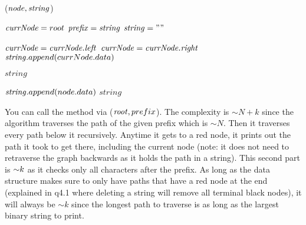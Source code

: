 \begin{problem}
\begin{questions}
\begin{myalgo}{($\textit{node\/},\textit{string\/}$)}
    \RETURN
  \ENDIF

    \STATE $\textit{currNode\/} = root$
    \STATE $\textit{prefix\/} = \textit{string\/}$
    \STATE $\textit{string\/} = ""$

        \STATE $\textit{currNode\/} = \textit{currNode.left\/}$
        \STATE $\textit{currNode\/} = \textit{currNode.right\/}$
      \ENDIF
      \STATE $\textit{string\/}.append(currNode.data)$
    \ENDFOR

      \PRINT $string$ 
    \ENDIF

    \STATE {} 
    \STATE {} 
  \ELSE
    \STATE $\textit{string\/}.append(node.data)$ 
      \STATE {}
      \PRINT $string$
    \ENDIF

    \STATE {} 
    \STATE {} 
  \ENDIF
\end{myalgo}

You can call the method via ($\textit{root\/}, prefix$). The complexity is $\sim N + k$ since the algorithm traverses the path of the given prefix which is $\sim N$. Then it traverses every path below it recursively. Anytime it gets to a red node, it prints out the path it took to get there, including the current node (note: it does not need to retraverse the graph backwards as it holds the path in a string). This second part is $\mathord{\sim}k$ as it checks only all characters after the prefix. 
As long as the data structure makes sure to only have paths that have a red node at the end (explained in q4.1 where deleting a string will remove all terminal black nodes), it will always be $\sim k$ since the longest path to traverse is as long as the largest binary string to print. 


\end{questions}
\end{problem}
